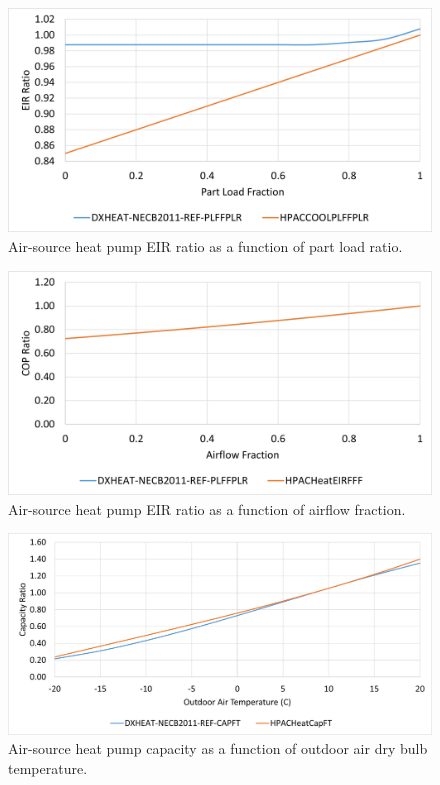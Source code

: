 \begin{figure}
    \centering \includegraphics[width=1.0\textwidth]{figures/ashp_eirfplr.png}
    \caption[Air-source heat pump EIR ratio as a function of part load ratio]{Air-source heat pump EIR ratio as a function of part load ratio.}
    \label{fig:ashp_eirfplr}
\end{figure}

\begin{figure}
    \centering \includegraphics[width=1.0\textwidth]{figures/ashp_eirff.png}
    \caption[Air-source heat pump EIR ratio as a function of airflow fraction]{Air-source heat pump EIR ratio as a function of airflow fraction.}
    \label{fig:ashp_eirff}
\end{figure}

\begin{figure}
    \centering \includegraphics[width=1.0\textwidth]{figures/ashp_capft.png}
    \caption[Air-source heat pump capacity as a function of outdoor air dry bulb temperature]{Air-source heat pump capacity as a function of outdoor air dry bulb temperature.}
    \label{fig:ashp_capft}
\end{figure}

